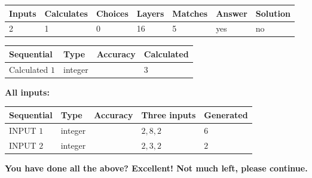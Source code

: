 \documentclass[12pt]{article}
\begin{document}
  
 
 
\noindent{}
 
 
 
   
   
   
   
\noindent\begin{tabular}{|l|l|l|l|l|l|l|}
 \hline
Inputs & Calculates & Choices & Layers & Matches & Answer & Solution \\ \hline
           2 & 
           1 & 
           0
  & 
          16 & 
           5 & 
  yes & 
  no 
  \\ \hline
 \end{tabular}
   
   
   
   
\noindent{}
   
   
  
  
\noindent\begin{tabular}{|l|l|l|l|}
\hline
 Sequential & Type & Accuracy & Calculated \\ 
\hline
 
 
  Calculated $           1$ & integer &  & 
  $ 3 $ 
 \\  \hline  
 \end{tabular}
   
   
   
   
\noindent\vspace{0.1in}\hspace{-0.08in} {\textbf{\Large{All inputs: }}}
   
   
  
  
\noindent\begin{tabular}{|l|l|l|l|l|}
\hline
 Sequential & Type & Accuracy & Three inputs & Generated \\ 
\hline
 
 
  INPUT $           1$ & integer &  & $
 2
 , 
 8
 , 
 2
 $ & $ 6 $ 
 \\  \hline  
 
 
  INPUT $           2$ & integer &  & $
 2
 , 
 3
 , 
 2
 $ & $ 2 $ 
 \\  \hline  
 \end{tabular}
   
   
   
   
\vspace{0.3in}
{\textbf{\LARGE{You have done all the above? Excellent! Not much left, please continue.}}}
\vspace{0.3in}
   
\end{document}

